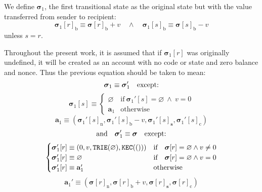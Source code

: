 \documentclass[9pt,oneside]{amsart}
\begin{document}
\begin{multicols}{2}
We define $\boldsymbol{\sigma}_1$, the first transitional state as the original state but with the value transferred from sender to recipient:
\begin{equation}
\boldsymbol{\sigma}_1[r]_{\mathrm{b}} \equiv \boldsymbol{\sigma}[r]_{\mathrm{b}} + v \quad\wedge\quad \boldsymbol{\sigma}_1[s]_{\mathrm{b}} \equiv \boldsymbol{\sigma}[s]_{\mathrm{b}} - v
\end{equation}
unless $s = r$.

Throughout the present work, it is assumed that if $\boldsymbol{\sigma}_1[r]$ was originally undefined, it will be created as an account with no code or state and zero balance and nonce. Thus the previous equation should be taken to mean:
\begin{equation}
\boldsymbol{\sigma}_1 \equiv \boldsymbol{\sigma}_1' \quad \text{except:} \\
\end{equation}
\begin{equation}
\boldsymbol{\sigma}_1[s] \equiv \begin{cases}
\varnothing & \text{if}\ \boldsymbol{\sigma}_1'[s] = \varnothing \ \wedge\ v = 0 \\
\mathbf{a}_1 &\text{otherwise}
\end{cases}
\end{equation}
\begin{equation}
\mathbf{a}_1 \equiv \left(\boldsymbol{\sigma}_1'[s]_{\mathrm{n}}, \boldsymbol{\sigma}_1'[s]_{\mathrm{b}} - v, \boldsymbol{\sigma}_1'[s]_{\mathbf{s}}, \boldsymbol{\sigma}_1'[s]_{\mathrm{c}}\right)
\end{equation}
\begin{equation}
\text{and}\quad \boldsymbol{\sigma}_1' \equiv \boldsymbol{\sigma} \quad \text{except:} \\
\end{equation}
\begin{equation}
\begin{cases}
\boldsymbol{\sigma}_1'[r] \equiv (0, v, \mathtt{\tiny TRIE}(\varnothing), \mathtt{\tiny KEC}(())) & \text{if} \quad \boldsymbol{\sigma}[r] = \varnothing \wedge v \neq 0 \\
\boldsymbol{\sigma}_1'[r] \equiv \varnothing & \text{if}\quad \boldsymbol{\sigma}[r] = \varnothing \wedge v = 0 \\
\boldsymbol{\sigma}_1'[r] \equiv \mathbf{a}_1' & \text{otherwise}
\end{cases}
\end{equation}
\begin{equation}
\mathbf{a}_1' \equiv (\boldsymbol{\sigma}[r]_{\mathrm{n}}, \boldsymbol{\sigma}[r]_{\mathrm{b}} + v, \boldsymbol{\sigma}[r]_{\mathbf{s}}, \boldsymbol{\sigma}[r]_{\mathrm{c}})
\end{equation}


\end{multicols}
\end{document}

